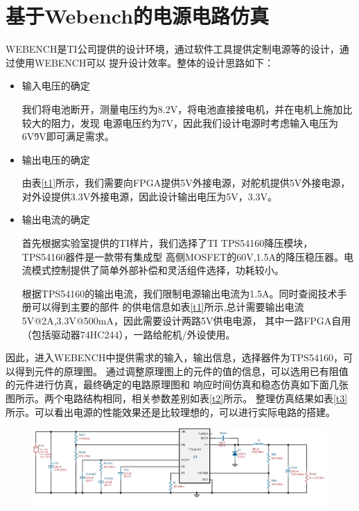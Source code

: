 \documentclass[a4paper]{paper}
\begin{document}
\section{基于Webench的电源电路仿真}
WEBENCH是TI公司提供的设计环境，通过软件工具提供定制电源等的设计，通过使用WEBENCH可以
提升设计效率。整体的设计思路如下：
\begin{itemize}
    \item 输入电压的确定

    我们将电池断开，测量电压约为8.2V，将电池直接接电机，并在电机上施加比较大的阻力，发现
    电源电压约为7V，因此我们设计电源时考虑输入电压为6V\~9V即可满足需求。

    \item 输出电压的确定

    由表\ref{t1}所示，我们需要向FPGA提供5V外接电源，对舵机提供5V外接电源，
    对外设提供3.3V外接电源，因此设计输出电压为5V，3.3V。

    \item 输出电流的确定

    首先根据实验室提供的TI样片，我们选择了TI TPS54160降压模块，TPS54160器件是一款带有集成型
    高侧MOSFET的60V,1.5A的降压稳压器。电流模式控制提供了简单外部补偿和灵活组件选择，功耗较小。

    根据TPS54160的输出电流，我们限制电源输出电流为1.5A。同时查阅技术手册可以得到主要的部件
    的供电信息如表\ref{t1}所示,总计需要输出电流5V@2A,3.3V@500mA，因此需要设计两路5V供电电源，
    其中一路FPGA自用（包括驱动器74HC244），一路给舵机/外设使用。

\end{itemize}
因此，进入WEBENCH中提供需求的输入，输出信息，选择器件为TPS54160，可以得到元件的原理图。
通过调整原理图上的元件的值的信息，可以选用已有阻值的元件进行仿真，最终确定的电路原理图和
响应时间仿真和稳态仿真如下面几张图所示。两个电路结构相同，相关参数差别如表\ref{t2}所示。
整理仿真结果如表\ref{t3}所示。可以看出电源的性能效果还是比较理想的，可以进行实际电路的搭建。
\begin{figure}
    \centering
    \includegraphics[width = \textwidth]{../circuit/6-9to5V@1.5A.JPG}
\end{figure}
\end{document}
